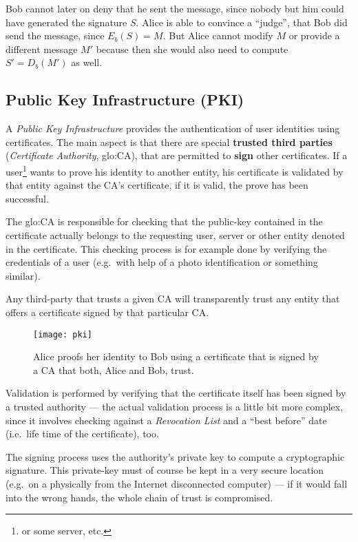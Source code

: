 Bob cannot  later on deny that he  sent the message, since  nobody but him
could  have generated  the signature  $S$.  Alice  is able  to  convince a
``judge'', that  Bob did send the  message, since $E_b(S) =  M$. But Alice
cannot modify  $M$ or  provide a different  message $M'$ because  then she
would also need to compute $S' = D_b(M')$ as well.

\subsection[Public Key Infrastructure]{Public Key Infrastructure (PKI)}

A  \emph{Public Key  Infrastructure} provides  the authentication  of user
identities using certificates.  The main  aspect is that there are special
\textbf{trusted    third     parties}    (\emph{Certificate    Authority},
\gls{glo:CA}), that are permitted  to \textbf{sign} other certificates. If
a  user\footnote{or some  server, etc.}   wants to  prove his  identity to
another entity,  his certificate is  validated by that entity  against the
CA's certificate, if it is valid, the prove has been successful.

The \gls{glo:CA} is responsible for checking that the public-key contained
in  the certificate  actually belongs  to the  requesting user,  server or
other  entity denoted  in the  certificate. This  checking process  is for
example done by  verifying the credentials of a user  (e.g.~with help of a
photo identification or something similar).

Any third-party that trusts a given CA will transparently trust any entity
that offers a certificate signed by that particular CA.

\begin{figure}[h]
  \centering
  \texttt{[image: pki]}
  \caption[Public  Key Infrastructure]{Alice  proofs her  identity  to Bob
    using a certificate  that is signed by a CA that  both, Alice and Bob,
    trust.}
  \label{fig:pki}
\end{figure}

Validation is performed by verifying  that the certificate itself has been
signed  by a  trusted authority  --- the  actual validation  process  is a
little   bit  more  complex,   since  it   involves  checking   against  a
\emph{Revocation List} and  a ``best before'' date (i.e.~life  time of the
certificate), too.

The  signing  process  uses  the  authority's private  key  to  compute  a
cryptographic signature. This private-key must of course be kept in a very
secure  location  (e.g.~on a  physically  from  the Internet  disconnected
computer) ---  if it would fall into  the wrong hands, the  whole chain of
trust is compromised.

